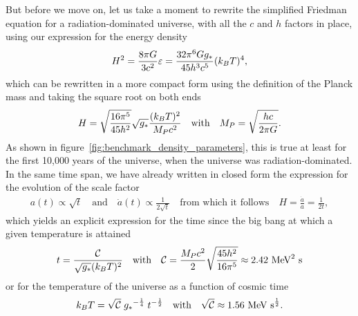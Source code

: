 But before we move on, let us take a moment to rewrite the simplified Friedman equation
for a radiation-dominated universe, with all the $c$ and $h$ factors in place,
using our expression for the energy density
\begin{align*}
  H^2 = \frac{8 \pi G}{3 c^2} \varepsilon =
  \frac{32 \pi^6 G g_*}{45 h^3 c^5} (k_B T)^4,
\end{align*}
which can be rewritten in a more compact form using the definition of the Planck
mass and taking the square root on both ends
\begin{align*}
  H = \sqrt{\frac{16 \pi^5}{45 h^2}} \sqrt{g_*} \frac{(k_B T)^2}{M_P c^2}
  \quad\text{with}\quad
  M_P = \sqrt{\frac{h c}{2 \pi G}}.
\end{align*}
As shown in figure~\ref{fig:benchmark_density_parameters}, this is true at least
for the first 10,000 years of the universe, when the universe was radiation-dominated.
In the same time span, we have already written in closed form the expression for
the evolution of the scale factor
\begin{align*}
  a(t) \propto \sqrt{t} \quad\text{and}\quad
  \dot{a}(t) \propto \frac{1}{2\sqrt{t}} \quad\text{from which it follows}\quad
  H = \frac{\dot{a}}{a} = \frac{1}{2t},
\end{align*}
which yields an explicit expression for the time since the big bang at which a
given temperature is attained
\begin{align}\label{eq:cosmo_time_temperature}
  t = \frac{\mathcal{C}}{\sqrt{g_*} (k_B T)^2}
  \quad\text{with}\quad
  \mathcal{C} = \frac{M_P c^2}{2} \sqrt{\frac{45 h^2}{16 \pi^5}}
  \approx 2.42~\text{MeV}^2~\text{s}
\end{align}
or for the temperature of the universe as a function of cosmic time
\begin{align}\label{eq:cosmo_temperature_vs_time}
  k_B T = \sqrt{\mathcal{C}} \; g_*{}^{-\frac{1}{4}} \; t^{-\frac{1}{2}}
  \quad\text{with}\quad
  \sqrt{\mathcal{C}} \approx 1.56~\text{MeV~s}^\frac{1}{2}.
\end{align}



